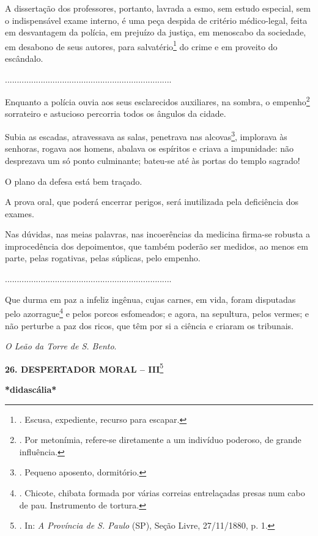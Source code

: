 A dissertação dos professores, portanto, lavrada a esmo, sem estudo
especial, sem o indispensável exame interno, é uma peça despida de
critério médico-legal, feita em desvantagem da polícia, em prejuízo da
justiça, em menoscabo da sociedade, em desabono de seus autores, para
salvatério\footnote{. Escusa, expediente, recurso para escapar.} do
crime e em proveito do escândalo.

......................................................................

Enquanto a polícia ouvia aos seus esclarecidos auxiliares, na sombra, o
empenho\footnote{. Por metonímia, refere-se diretamente a um indivíduo
  poderoso, de grande influência.} sorrateiro e astucioso percorria
todos os ângulos da cidade.

Subia as escadas, atravessava as salas, penetrava nas alcovas\footnote{.
  Pequeno aposento, dormitório.}, implorava às senhoras, rogava aos
homens, abalava os espíritos e criava a impunidade: não desprezava um só
ponto culminante; bateu-se até às portas do templo sagrado!

O plano da defesa está bem traçado.

A prova oral, que poderá encerrar perigos, será inutilizada pela
deficiência dos exames.

Nas dúvidas, nas meias palavras, nas incoerências da medicina firma-se
robusta a improcedência dos depoimentos, que também poderão ser medidos,
ao menos em parte, pelas rogativas, pelas súplicas, pelo empenho.

......................................................................

Que durma em paz a infeliz ingênua, cujas carnes, em vida, foram
disputadas pelo azorrague\footnote{. Chicote, chibata formada por várias
  correias entrelaçadas presas num cabo de pau. Instrumento de tortura.}
e pelos porcos esfomeados;
e agora, na sepultura, pelos vermes; e não perturbe a paz dos ricos, que
têm por si a ciência e criaram os tribunais.

\emph{O Leão da Torre de S. Bento}.

\textbf{26. DESPERTADOR MORAL -- III}\footnote{. In: \emph{A Província
  de S. Paulo} (SP), Seção Livre, 27/11/1880, p. 1.}

\textbf{*didascália*}


